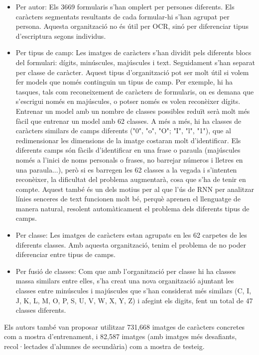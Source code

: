 \documentclass[12pt, spanish]{article}
\begin{document}
\begin{itemize}
\item Per autor: Els 3669 formularis s'han omplert per persones diferents. Els caràcters segmentats resultants de cada formular-hi s'han agrupat per persona. Aquesta organització no és útil per OCR, sinó per diferenciar tipus d'escriptura segons individus.

\item Per tipus de camp: Les imatges de caràcters s'han dividit pels diferents blocs del formulari: dígits, minúscules, majúscules i text. Seguidament s'han separat per classe de caràcter. Aquest tipus d'organització pot ser molt útil si volem fer models que només continguin un tipus de camp. Per exemple, hi ha tasques, tals com reconeixement de caràcters de formularis, on es demana que s'escrigui només en majúscules, o potser només es volen reconèixer dígits. Entrenar un model amb un nombre de classes possibles reduït serà molt més fàcil que entrenar un model amb 62 classes. A més a més, hi ha classes de caràcters similars de camps diferents ("0", "o", "O"; "I", "l", "1"), que al redimensionar les dimensions de la imatge costaran molt d'identificar. Els diferents camps són fàcils d'identificar en una frase o paraula (majúscules només a l'inici de noms personals o frases, no barrejar números i lletres en una paraula...), però si es barregen les 62 classes a la vegada i s'intenten reconèixer, la dificultat del problema augmentarà, cosa que s'ha de tenir en compte. Aquest també és un dels motius per al que l'ús de RNN per analitzar línies senceres de text funcionen molt bé, perquè aprenen el llenguatge de manera natural, resolent automàticament el problema dels diferents tipus de camps. 

\item Per classe: Les imatges de caràcters estan agrupats en les 62 carpetes de les diferents classes. Amb aquesta organització, tenim el problema de no poder diferenciar entre tipus de camps. 

\item Per fusió de classes: Com que amb l'organització per classe hi ha classes massa similars entre elles, s'ha creat una nova organització ajuntant les classes entre minúscules i majúscules  que s'han considerat més similars (C, I, J, K, L, M, O, P, S, U, V, W, X, Y, Z) i afegint els digits, fent un total de 47 classes diferents.
\end{itemize}

Els autors també van proposar utilitzar 731,668 imatges de caràcters concretes com a mostra d'entrenament, i 82,587 imatges (amb imatges més desafiants, recol·lectades d'alumnes de secundària) com a mostra de testeig.
\end{document}
